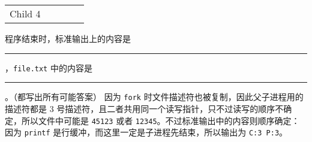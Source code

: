 \begin{problems}
\begin{table}[H]
\begin{tabular}{ccccc}
                \multicolumn{1}{|c|}{Child 4} & \multicolumn{1}{c|}{} & \multicolumn{1}{c|}{} & \multicolumn{1}{c|}{} & \multicolumn{1}{c|}{} \\ \cline{1-1} \cline{3-3} \cline{5-5} 
            \end{tabular}
        \end{table}
        \qn 程序结束时，标准输出上的内容是 \rule{3.5cm}{0.25mm}，\verb|file.txt| 中的内容是 \rule{3.5cm}{0.25mm}。（都写出所有可能答案）
        \sol 因为 \verb|fork| 时文件描述符也被复制，因此父子进程用的描述符都是 3 号描述符，且二者共用同一个读写指针，只不过读写的顺序不确定，所以文件中可能是 \verb|45123| 或者 \verb|12345|。不过标准输出中的内容则顺序确定：因为 \verb|printf| 是行缓冲，而这里一定是子进程先结束，所以输出为 \verb|C:3 P:3|。
    \end{problems}

